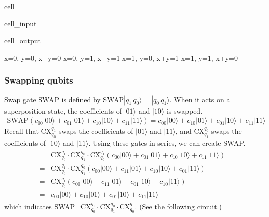 \documentclass[letterpaper,10pt,english]{jupyterBook}
\begin{document}
\begin{sphinxuseclass}{cell}
\begin{sphinxVerbatimInput}
\begin{sphinxuseclass}{cell_input}
\end{sphinxuseclass}\end{sphinxVerbatimInput}
\begin{sphinxVerbatimOutput}

\begin{sphinxuseclass}{cell_output}
\begin{sphinxVerbatim}[commandchars=\\\{\}]
x=0, y=0, x+y=0
x=0, y=1, x+y=1
x=1, y=0, x+y=1
x=1, y=1, x+y=0
\end{sphinxVerbatim}

\end{sphinxuseclass}\end{sphinxVerbatimOutput}

\end{sphinxuseclass}

\subsubsection{Swapping qubits}
\label{\detokenize{q2gates/cx:swapping-qubits}}
\sphinxAtStartPar
Swap gate SWAP is defined by SWAP\(|q_1\, q_0\rangle = |q_0\, q_1\rangle\).  When it acts on a superposition state, the coefficients of \(|01\rangle\) and \(|10\rangle\) is swapped.
\begin{equation*}
\begin{split}
\text{SWAP} \left (c_{00} |00\rangle + c_{01} |01\rangle + c_{10} |10\rangle + c_{11} |11\rangle \right ) =
c_{00} |00\rangle + c_{10} |01\rangle + c_{01} |10\rangle + c_{11} |11\rangle
\end{split}
\end{equation*}
\sphinxAtStartPar
Recall that CX\(_{q_0}^{q_1}\) swaps the coefficients of \(|01\rangle\) and \(|11\rangle\), and  CX\(_{q_1}^{q_0}\) swaps the coefficients of \(|10\rangle\) and \(|11\rangle\).  Using these gates in series, we can create SWAP.
\begin{equation*}
\begin{split}
\begin{align}
&\text{CX}_{q_0}^{q_1} \cdot \text{CX}_{q_1}^{q_0} \cdot \text{CX}_{q_0}^{q_1} \left(c_{00} |00\rangle + c_{01} |01\rangle + c_{10} |10\rangle + c_{11} |11\rangle \right)\\
= &\text{CX}_{q_0}^{q_1} \cdot \text{CX}_{q_1}^{q_0} \left(c_{00} |00\rangle + c_{11} |01\rangle + c_{10} |10\rangle + c_{01} |11\rangle \right) \\
= &\text{CX}_{q_0}^{q_1}  \left(c_{00} |00\rangle + c_{11} |01\rangle + c_{01} |10\rangle + c_{10} |11\rangle \right)\\
= & c_{00} |00\rangle + c_{10} |01\rangle + c_{01} |10\rangle + c_{11} |11\rangle
\end{align}
\end{split}
\end{equation*}
\sphinxAtStartPar
which indicates SWAP=\(\text{CX}_{q_0}^{q_1} \cdot  \text{CX}_{q_1}^{q_0} \cdot \text{CX}_{q_0}^{q_1}\). (See the following circuit.)
\end{document}
